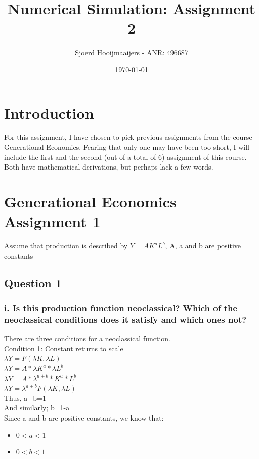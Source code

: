 \documentclass[a4paper]{article}
\title{Numerical Simulation: Assignment 2}
\author{Sjoerd Hooijmaaijers - ANR: 496687}
\date{\today}
\begin{document}
\maketitle



\section{Introduction}

For this assignment, I have chosen to pick previous assignments from the course Generational Economics.
Fearing that only one may have been too short, I will include the first and the second (out of a total of 6) assignment of this course.
Both have mathematical derivations, but perhaps lack a few words.

\section{Generational Economics Assignment 1}
Assume that production is described by $Y=AK^a L^b$, A, a and b are positive constants
\subsection{Question 1}
\subsubsection*{ i. Is this production function neoclassical? Which of the neoclassical conditions does it satisfy and which ones not?}
There are three conditions for a neoclassical function.\\
Condition 1: Constant returns to scale \\
$ \lambda Y = F(\lambda K,\lambda L)$ \\
$ \lambda Y = A*\lambda K^a*\lambda L^b$ \\
$ \lambda Y = A*\lambda ^{a+b}* K^a* L^b$ \\
$ \lambda Y = \lambda ^{a+b}F(\lambda K,\lambda L)$ \\

Thus, a+b=1 \\ 
And similarly; b=1-a \\
Since a and b are positive constants, we know that: 

\begin{itemize}
\item $0<a<1$
\item $0<b<1$
\end{itemize} 
\end{document}
